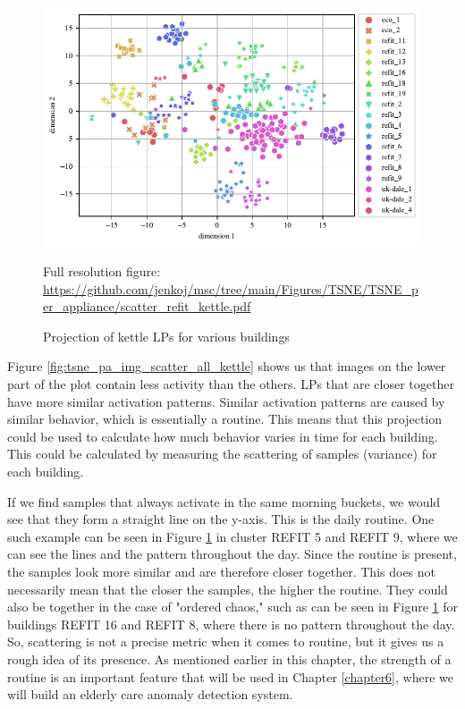 \begin{figure}[H]
	\centering
	\caption{Projection of kettle LPs for various buildings}
	\includegraphics[]{Figures/TSNE/TSNE_per_appliance/scatter_refit_kettle.pdf}
	\label{fig:tsne_pa_scatter_all_kettle}
	\par
	\par\footnotesize{Full resolution figure: \url{https://github.com/jenkoj/msc/tree/main/Figures/TSNE/TSNE_per_appliance/scatter_refit_kettle.pdf}}
\end{figure}

Figure \ref{fig:tsne_pa_img_scatter_all_kettle} shows us that images on the lower part of the plot contain less activity than the others.
LPs that are closer together have more similar activation patterns.
Similar activation patterns are caused by similar behavior, which is essentially a routine.
This means that this projection could be used to calculate how much behavior varies in time for each building.
This could be calculated by measuring the scattering of samples (variance) for each building.

If we find samples that always activate in the same morning buckets, we would see that they form a straight line on the y-axis.
This is the daily routine. One such example can be seen in Figure \ref{fig:tsne_pa_scatter_all_kettle} in cluster REFIT 5 and REFIT 9, where we can see the lines and the pattern throughout the day.
Since the routine is present, the samples look more similar and are therefore closer together.
This does not necessarily mean that the closer the samples, the higher the routine.
They could also be together in the case of "ordered chaos," such as can be seen in Figure \ref{fig:tsne_pa_scatter_all_kettle} for buildings REFIT 16 and REFIT 8, where there is no pattern throughout the day.
So, scattering is not a precise metric when it comes to routine, but it gives us a rough idea of its presence.
As mentioned earlier in this chapter, the strength of a routine is an important feature that will be used in Chapter \ref{chapter6}, where we will build an elderly care anomaly detection system.

